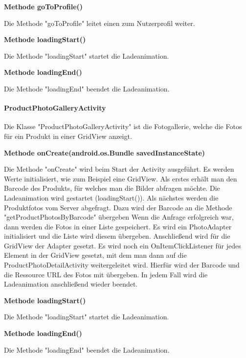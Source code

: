 \documentclass{scrartcl}
\begin{document}
\noindent\textbf{Methode goToProfile()} 

\noindent Die Methode "goToProfile" leitet einen zum Nutzerprofil weiter. \newline

\noindent\textbf{Methode loadingStart()}

\noindent Die Methode "loadingStart" startet die Ladeanimation. \newline

\noindent\textbf{Methode loadingEnd()}

\noindent Die Methode "loadingEnd" beendet die Ladeanimation. \newline

\paragraph{ProductPhotoGalleryActivity}
Die Klasse "ProductPhotoGalleryActivity" ist die Fotogallerie, welche die Fotos für ein Produkt in einer GridView anzeigt. \newline 

\noindent\textbf{Methode onCreate(android.os.Bundle savedInstanceState)}

\noindent Die Methode "onCreate" wird beim Start der Activity ausgeführt. Es werden Werte initialisiert, wie zum Beispiel eine GridView. Als erstes erhält man den Barcode des Produkts, für welches man die Bilder abfragen möchte. Die Ladeanimation wird gestartet (loadingStart()). Als nächstes werden die Produktfotos vom Server abgefragt. Dazu wird der Barcode an die Methode "getProductPhotosByBarcode" übergeben Wenn die Anfrage erfolgreich war, dann werden die Fotos in einer Liste gespeichert. Es wird ein PhotoAdapter initialisiert und die Liste wird diesem übergeben. Anschließend wird für die GridView der Adapter gesetzt. Es wird noch ein OnItemClickListener für jedes Element in der GridView gesetzt, mit dem man dann auf die ProductPhotoDetailActivity weitergeleitet wird. Hierfür wird der Barcode und die Ressource URL des Fotos mit übergeben. In jedem Fall wird die Ladeanimation anschließend wieder beendet. \newline 

\noindent\textbf{Methode loadingStart()}

\noindent Die Methode "loadingStart" startet die Ladeanimation. \newline

\noindent\textbf{Methode loadingEnd()}

\noindent Die Methode "loadingEnd" beendet die Ladeanimation. \newline
\end{document}
